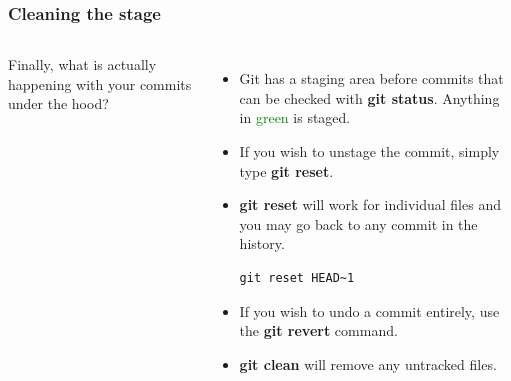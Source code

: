 \documentclass{beamer}
\begin{document}
\begin{frame}[fragile]
\frametitle{Cleaning the stage}
\begin{columns}
Finally, what is actually happening with your commits under the hood?
\begin{itemize}
\item Git has a staging area before commits that can be checked with \textbf{git status}. Anything in \textcolor{green}{green} is staged.
\item If you wish to unstage the commit, simply type \textbf{git reset}.
\item \textbf{git reset} will work for individual files and you may go back to any commit in the history.
        \begin{lstlisting}
git reset HEAD~1
        \end{lstlisting}
\item If you wish to undo a commit entirely, use the \textbf{git revert} command.
\item \textbf{git clean} will remove any untracked files.
\end{itemize}

\end{columns}
\end{frame}
\end{document}
